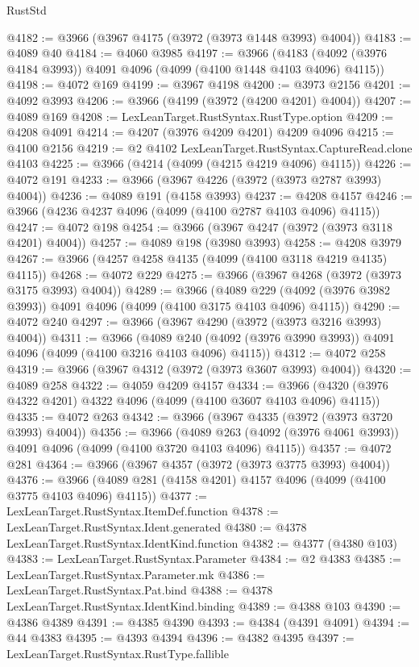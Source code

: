 \begin{lexlean}{RustStd}
\begin{coremodule}
@4182 := @3966 (@3967 @4175 (@3972 (@3973 @1448 @3993) @4004))
@4183 := @4089 @40
@4184 := @4060 @3985
@4197 := @3966
    (@4183 (@4092 (@3976 @4184 @3993)) @4091 @4096 (@4099 (@4100 @1448 @4103 @4096) @4115))
@4198 := @4072 @169
@4199 := @3967 @4198
@4200 := @3973 @2156
@4201 := @4092 @3993
@4206 := @3966 (@4199 (@3972 (@4200 @4201) @4004))
@4207 := @4089 @169
@4208 := LexLeanTarget.RustSyntax.RustType.option
@4209 := @4208 @4091
@4214 := @4207 (@3976 @4209 @4201) @4209 @4096
@4215 := @4100 @2156
@4219 := @2 @4102 LexLeanTarget.RustSyntax.CaptureRead.clone @4103
@4225 := @3966 (@4214 (@4099 (@4215 @4219 @4096) @4115))
@4226 := @4072 @191
@4233 := @3966 (@3967 @4226 (@3972 (@3973 @2787 @3993) @4004))
@4236 := @4089 @191 (@4158 @3993)
@4237 := @4208 @4157
@4246 := @3966 (@4236 @4237 @4096 (@4099 (@4100 @2787 @4103 @4096) @4115))
@4247 := @4072 @198
@4254 := @3966 (@3967 @4247 (@3972 (@3973 @3118 @4201) @4004))
@4257 := @4089 @198 (@3980 @3993)
@4258 := @4208 @3979
@4267 := @3966 (@4257 @4258 @4135 (@4099 (@4100 @3118 @4219 @4135) @4115))
@4268 := @4072 @229
@4275 := @3966 (@3967 @4268 (@3972 (@3973 @3175 @3993) @4004))
@4289 := @3966
    (@4089 @229 (@4092 (@3976 @3982 @3993)) @4091 @4096 (@4099 (@4100 @3175 @4103 @4096) @4115))
@4290 := @4072 @240
@4297 := @3966 (@3967 @4290 (@3972 (@3973 @3216 @3993) @4004))
@4311 := @3966
    (@4089 @240 (@4092 (@3976 @3990 @3993)) @4091 @4096 (@4099 (@4100 @3216 @4103 @4096) @4115))
@4312 := @4072 @258
@4319 := @3966 (@3967 @4312 (@3972 (@3973 @3607 @3993) @4004))
@4320 := @4089 @258
@4322 := @4059 @4209 @4157
@4334 := @3966 (@4320 (@3976 @4322 @4201) @4322 @4096 (@4099 (@4100 @3607 @4103 @4096) @4115))
@4335 := @4072 @263
@4342 := @3966 (@3967 @4335 (@3972 (@3973 @3720 @3993) @4004))
@4356 := @3966
    (@4089 @263 (@4092 (@3976 @4061 @3993)) @4091 @4096 (@4099 (@4100 @3720 @4103 @4096) @4115))
@4357 := @4072 @281
@4364 := @3966 (@3967 @4357 (@3972 (@3973 @3775 @3993) @4004))
@4376 := @3966 (@4089 @281 (@4158 @4201) @4157 @4096 (@4099 (@4100 @3775 @4103 @4096) @4115))
@4377 := LexLeanTarget.RustSyntax.ItemDef.function
@4378 := LexLeanTarget.RustSyntax.Ident.generated
@4380 := @4378 LexLeanTarget.RustSyntax.IdentKind.function
@4382 := @4377 (@4380 @103)
@4383 := LexLeanTarget.RustSyntax.Parameter
@4384 := @2 @4383
@4385 := LexLeanTarget.RustSyntax.Parameter.mk
@4386 := LexLeanTarget.RustSyntax.Pat.bind
@4388 := @4378 LexLeanTarget.RustSyntax.IdentKind.binding
@4389 := @4388 @103
@4390 := @4386 @4389
@4391 := @4385 @4390
@4393 := @4384 (@4391 @4091)
@4394 := @44 @4383
@4395 := @4393 @4394
@4396 := @4382 @4395
@4397 := LexLeanTarget.RustSyntax.RustType.fallible

\end{coremodule}
\end{lexlean}
